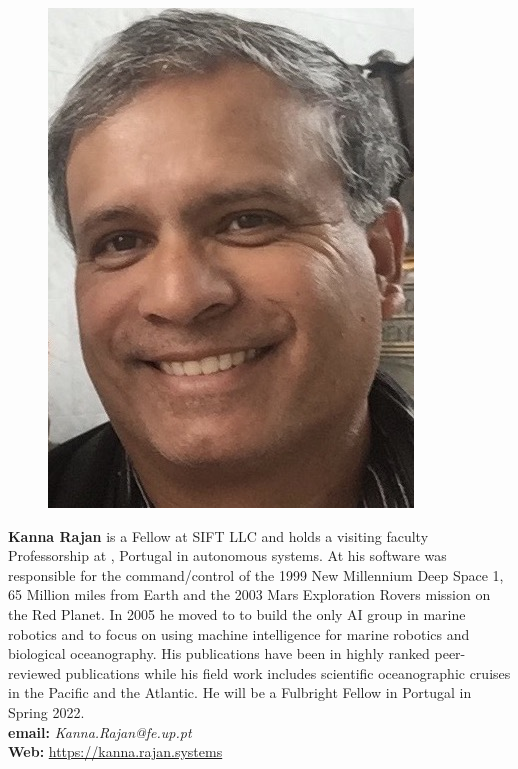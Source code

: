 \parbox{6.5in}{
\begin{figure} %
    \vspace{-\intextsep}
    \hspace*{-.35\columnsep}\includegraphics[scale=0.4]{fig/KRajan.jpg}
\end{figure}
\textbf{Kanna Rajan} is a Fellow at SIFT LLC and holds a visiting
faculty Professorship at \unive, Portugal in autonomous systems. At
\nas his software was responsible for the command/control of the 1999
New Millennium Deep Space 1, 65 Million miles from Earth and the 2003
Mars Exploration Rovers mission on the Red Planet. In 2005 he moved to
\mba to build the only AI group in marine robotics and to focus on
using machine intelligence for marine robotics and biological
oceanography.  His publications have been in highly ranked
peer-reviewed publications while his field work includes scientific
oceanographic cruises in the Pacific and the Atlantic. He will be a
Fulbright Fellow in Portugal in Spring 2022.\\

\textbf{email: }\emph{Kanna.Rajan@fe.up.pt}\\
\textbf{Web: }\url{https://kanna.rajan.systems}
}
